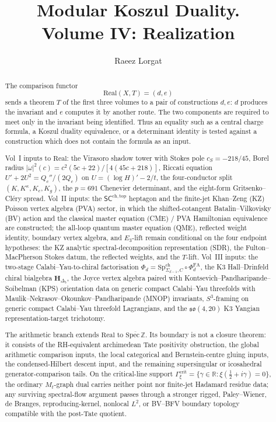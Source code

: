 \documentclass[11pt]{memoir}
\title{Modular Koszul Duality. \\ Volume IV: Realization}
\author{Raeez Lorgat}
\date{}
\begin{document}
\frontmatter
\maketitle

\begin{abstract}
The comparison functor
\[
 \mathrm{Real}(X,T)=(d,e)
\]
sends a theorem \(T\) of the first three volumes to a pair of
constructions \(d,e\): \(d\) produces the invariant and \(e\)
computes it by another route.
The two components are required to meet only in the invariant being
identified. Thus an equality such as a central charge formula, a
Koszul duality equivalence, or a determinant identity is tested
against a construction which does not contain the formula as an
input.

Vol~I inputs to \(\mathrm{Real}\): the Virasoro shadow tower with
Stokes pole \(c_S=-218/45\), Borel radius
\(|\omega|^2(c)=c^2(5c+22)/[4(45c+218)]\), Riccati equation
\(U'+2U^2=Q_c''/(2Q_c)\) on \(U=(\log H)'-2/t\), the four-conductor
split \((K,K^\kappa,K_c,K_g)\), the \(p=691\) Chenevier
determinant, and the eight-form Gritsenko--Cl\'ery spread.
Vol~II inputs: the \(\mathsf{SC}^{\mathrm{ch,top}}\) heptagon and
the finite-jet Khan--Zeng (KZ) Poisson vertex algebra (PVA) sector,
in which the shifted-cotangent Batalin--Vilkovisky (BV) action and
the classical master equation (CME) / PVA Hamiltonian equivalence
are constructed; the all-loop quantum master equation (QME),
reflected weight identity, boundary vertex algebra, and \(E_3\)-lift
remain conditional on the four endpoint hypotheses: the KZ analytic
spectral-decomposition representation (SDR), the Fulton--MacPherson
Stokes datum, the reflected weights, and the \(T\)-lift. Vol~III inputs: the
two-stage Calabi--Yau-to-chiral factorisation
\(\Phi_d=\mathrm{Sp}^{\mathrm{ch}}_{\Sigma_{d-1},C}\circ
\Phi^{\mathrm{FA}}_d\), the K3 Hall--Drinfeld chiral bialgebra
\(\mathbf{H}_{\Delta_5}\), the Joyce vertex algebra paired with
Kontsevich--Pandharipande--Soibelman (KPS) orientation data on
generic compact Calabi--Yau threefolds with
Maulik--Nekrasov--Okounkov--Pandharipande (MNOP) invariants,
\(S^3\)-framing on generic compact Calabi--Yau threefold Lagrangians,
and the \(\mathfrak{so}(4,20)\) K3 Yangian representation-target
trichotomy.

The arithmetic branch extends \(\mathrm{Real}\) to
\(\overline{\mathrm{Spec}\,\mathbb Z}\). Its boundary is not a closure
theorem: it consists of the RH-equivalent archimedean Tate positivity
obstruction, the global arithmetic comparison inputs, the local
categorical and Bernstein-centre gluing inputs, the condensed-Hilbert
descent input, and the remaining supersingular or icosahedral
generator-comparison tails. On the critical-line support
\(\Gamma_\xi^{\mathrm{crit}}=\{\gamma\in\mathbb R:\xi(\tfrac12+i\gamma)=0\}\),
the ordinary \(M_t\)-graph dual carries neither point nor finite-jet
Hadamard residue data; any surviving spectral-flow argument passes
through a stronger rigged, Paley--Wiener, de Branges,
reproducing-kernel, nonlocal \(L^2\), or BV--BFV boundary topology
compatible with the post-Tate quotient.
\end{abstract}
\end{document}
